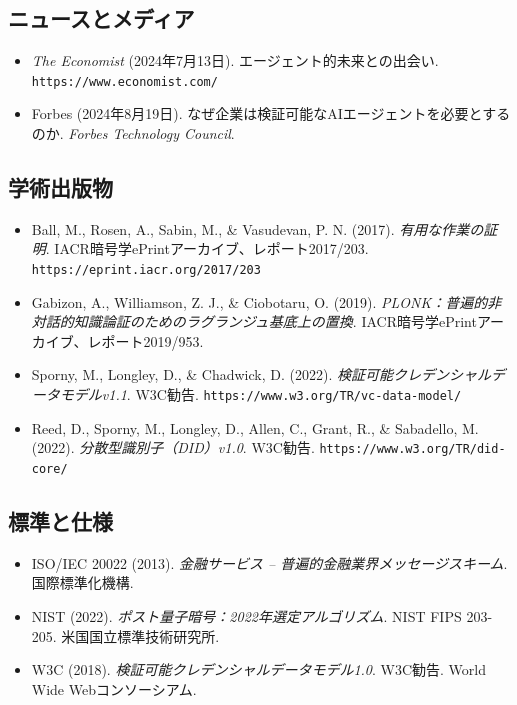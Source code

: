 \documentclass[11pt]{article}
\begin{document}
\subsection*{ニュースとメディア}

\begin{itemize}[leftmargin=*, label={}]
  \item \textit{The Economist} (2024年7月13日). エージェント的未来との出会い. \texttt{https://www.economist.com/}

  \item Forbes (2024年8月19日). なぜ企業は検証可能なAIエージェントを必要とするのか. \textit{Forbes Technology Council}.
\end{itemize}

\subsection*{学術出版物}

\begin{itemize}[leftmargin=*, label={}]
  \item Ball, M., Rosen, A., Sabin, M., \& Vasudevan, P. N. (2017). \textit{有用な作業の証明}. IACR暗号学ePrintアーカイブ、レポート2017/203. \texttt{https://eprint.iacr.org/2017/203}

  \item Gabizon, A., Williamson, Z. J., \& Ciobotaru, O. (2019). \textit{PLONK：普遍的非対話的知識論証のためのラグランジュ基底上の置換}. IACR暗号学ePrintアーカイブ、レポート2019/953.

  \item Sporny, M., Longley, D., \& Chadwick, D. (2022). \textit{検証可能クレデンシャルデータモデルv1.1}. W3C勧告. \texttt{https://www.w3.org/TR/vc-data-model/}

  \item Reed, D., Sporny, M., Longley, D., Allen, C., Grant, R., \& Sabadello, M. (2022). \textit{分散型識別子（DID）v1.0}. W3C勧告. \texttt{https://www.w3.org/TR/did-core/}
\end{itemize}

\subsection*{標準と仕様}

\begin{itemize}[leftmargin=*, label={}]
  \item ISO/IEC 20022 (2013). \textit{金融サービス -- 普遍的金融業界メッセージスキーム}. 国際標準化機構.

  \item NIST (2022). \textit{ポスト量子暗号：2022年選定アルゴリズム}. NIST FIPS 203-205. 米国国立標準技術研究所.

  \item W3C (2018). \textit{検証可能クレデンシャルデータモデル1.0}. W3C勧告. World Wide Webコンソーシアム.
\end{itemize}
\end{document}
